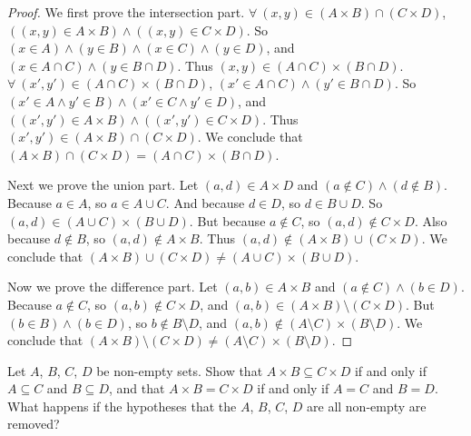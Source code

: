 \begin{proof}
We first prove the intersection part.
\(\forall\ (x, y) \in (A \times B) \cap (C \times D)\), \(((x, y) \in A \times B) \land ((x, y) \in C \times D)\).
So \((x \in A) \land (y \in B) \land (x \in C) \land (y \in D)\), and \((x \in A \cap C) \land (y \in B \cap D)\).
Thus \((x, y) \in (A \cap C) \times (B \cap D)\).
\(\forall\ (x', y') \in (A \cap C) \times (B \cap D)\), \((x' \in A \cap C) \land (y' \in B \cap D)\).
So \((x' \in A \land y' \in B) \land (x' \in C \land y' \in D)\), and \(((x', y') \in A \times B) \land ((x', y') \in C \times D)\).
Thus \((x', y') \in (A \times B) \cap (C \times D)\).
We conclude that \((A \times B) \cap (C \times D) = (A \cap C) \times (B \cap D)\).

Next we prove the union part.
Let \((a, d) \in A \times D\) and \((a \notin C) \land (d \notin B)\).
Because \(a \in A\), so \(a \in A \cup C\).
And because \(d \in D\), so \(d \in B \cup D\).
So \((a, d) \in (A \cup C) \times (B \cup D)\).
But because \(a \notin C\), so \((a, d) \notin C \times D\).
Also because \(d \notin B\), so \((a, d) \notin A \times B\).
Thus \((a, d) \notin (A \times B) \cup (C \times D)\).
We conclude that \((A \times B) \cup (C \times D) \neq (A \cup C) \times (B \cup D)\).

Now we prove the difference part.
Let \((a, b) \in A \times B\) and \((a \notin C) \land (b \in D)\).
Because \(a \notin C\), so \((a, b) \notin C \times D\), and \((a, b) \in (A \times B) \setminus (C \times D)\).
But \((b \in B) \land (b \in D)\), so \(b \notin B \setminus D\), and \((a, b) \notin (A \setminus C) \times (B \setminus D)\).
We conclude that \((A \times B) \setminus (C \times D) \neq (A \setminus C) \times (B \setminus D)\).
\end{proof}

\begin{exercise}\label{exercise 3.5.6}
Let \(A\), \(B\), \(C\), \(D\) be non-empty sets.
Show that \(A \times B \subseteq C \times D\) if and only if \(A \subseteq C\) and \(B \subseteq D\), and that \(A \times B = C \times D\) if and only if \(A = C\) and \(B = D\).
What happens if the hypotheses that the \(A\), \(B\), \(C\), \(D\) are all non-empty are removed?
\end{exercise}

